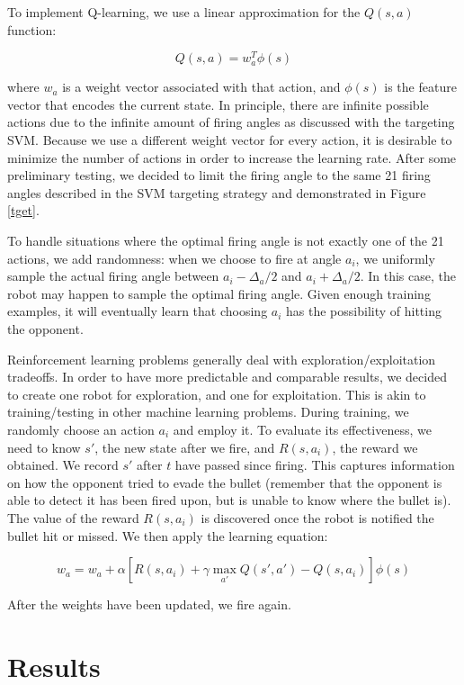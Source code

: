 \documentclass{article}
\theoremstyle{plain}
\theoremstyle{definition}
\theoremstyle{remark}
\begin{document}
To implement Q-learning, we use a linear approximation for the $Q(s, a)$ function:

$$Q(s, a) = w_a^T\phi(s)$$

where $w_a$ is a weight vector associated with that action, and $\phi(s)$ is the feature vector that encodes the current state. In principle, there are infinite possible actions due to the infinite amount of firing angles as discussed with the targeting SVM. Because we use a different weight vector for every action, it is desirable to minimize the number of actions in order to increase the learning rate. After some preliminary testing, we decided to limit the firing angle to the same 21 firing angles described in the SVM targeting strategy and demonstrated in Figure \ref{tget}.

To handle situations where the optimal firing angle is not exactly one of the 21 actions, we add randomness: when we choose to fire at angle $a_i$, we uniformly sample the actual firing angle between $a_i - \Delta_a/2$ and $a_i + \Delta_a/2$. In this case, the robot may happen to sample the optimal firing angle. Given enough training examples, it will eventually learn that choosing $a_i$ has the possibility of hitting the opponent.

Reinforcement learning problems generally deal with exploration/exploitation tradeoffs. In order to have more predictable and comparable results, we decided to create one robot for exploration, and one for exploitation. This is akin to training/testing in other machine learning problems. During training, we randomly choose an action $a_i$ and employ it. To evaluate its effectiveness, we need to know $s'$, the new state after we fire, and $R(s, a_i)$, the reward we obtained. We record $s'$ after $t$ have passed since firing. This captures information on how the opponent tried to evade the bullet (remember that the opponent is able to detect it has been fired upon, but is unable to know where the bullet is). The value of the reward $R(s, a_i)$ is discovered once the robot is notified the bullet hit or missed. We then apply the learning equation\cite{russelnorvig}:

$$w_a = w_a + \alpha\left[R(s, a_i) + \gamma\max_{a'}Q(s', a') - Q(s, a_i)\right]\phi(s)$$

After the weights have been updated, we fire again.

\section{Results}
\end{document}
